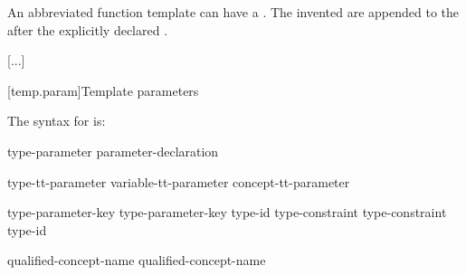 \documentclass{wg21}
\begin{document}
\pnum
An abbreviated function template can have a .
The invented  are
appended to the  after
the explicitly declared .
\begin{example}
    \textcolor{noteclr}{[...]}
\end{example}


[temp.param]{Template parameters}


\pnum
The syntax for
is:

\begin{bnf}
    \br
    type-parameter\br
    parameter-declaration\br
\begin{addedblock}
    type-tt-parameter \br
    variable-tt-parameter \br
    concept-tt-parameter
\end{addedblock}
\end{bnf}

\begin{bnf}
    \br
    type-parameter-key  \br
    type-parameter-key  \terminal{=} type-id\br
    type-constraint  \br
    type-constraint  \terminal{=} type-id\br
\end{bnf}

\begin{bnf}
    \br
    \br
\end{bnf}

\begin{bnf}
    \br
    qualified-concept-name \br
    qualified-concept-name \terminal{<}  \terminal{>}
\end{bnf}
\end{document}
